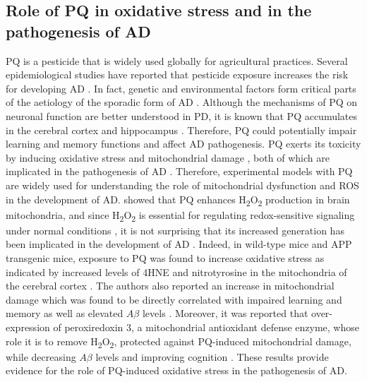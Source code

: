 \subsection{Role of PQ in oxidative stress and in the pathogenesis of AD}
PQ is a pesticide that is widely used globally for agricultural practices. Several epidemiological studies have reported that pesticide exposure increases the risk for developing AD \citep{Baldi2003,Hayden2010,Santibanez2007,Yan2016}. In fact, genetic and environmental factors form critical parts of the aetiology of the sporadic form of AD \citep{Landrigan2005}. Although the mechanisms of PQ on neuronal function are better understood in PD, it is known that PQ accumulates in the cerebral cortex and hippocampus \citep{Landrigan2005}. Therefore, PQ could potentially impair learning and memory functions and affect AD pathogenesis. PQ exerts its toxicity by inducing oxidative stress and mitochondrial damage \citep{Baltazar2014,Drechsel2008,Lin2006}, both of which are implicated in the pathogenesis of AD \citep{Lin2006}. Therefore, experimental models with PQ are widely used for understanding the role of mitochondrial dysfunction and ROS in the development of AD. \citet{Drechsel2008} showed that PQ enhances H\textsubscript{2}O\textsubscript{2} production in brain mitochondria, and since H\textsubscript{2}O\textsubscript{2} is essential for regulating redox-sensitive signaling under normal conditions \citep{Rhee2006}, it is not surprising that its increased generation has been implicated in the development of AD \citep{Du2008,Manczak2006}. Indeed, in wild-type mice and APP transgenic mice, exposure to PQ was found to increase oxidative stress as indicated by increased levels of 4HNE and nitrotyrosine in the mitochondria of the cerebral cortex \citep{Chen2012}. The authors also reported an increase in mitochondrial damage which was found to be directly correlated with impaired learning and memory as well as elevated $A\beta$ levels \citep{Chen2012}. Moreover, it was reported that over-expression of peroxiredoxin 3, a mitochondrial antioxidant defense enzyme, whose role it is to remove H\textsubscript{2}O\textsubscript{2}, protected against PQ-induced mitochondrial damage, while decreasing $A\beta$ levels and improving cognition \citep{Chen2012}. These results provide evidence for the role of PQ-induced oxidative stress in the pathogenesis of AD.

